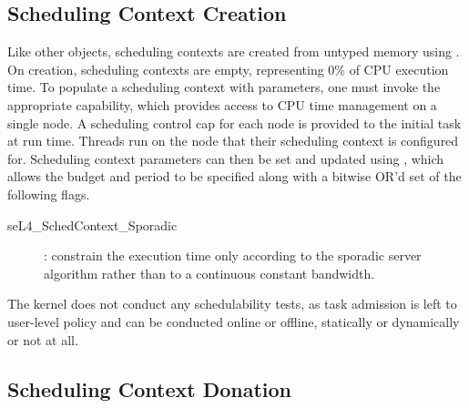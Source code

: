 \subsection{Scheduling Context Creation} \label{sec:sc_creation}

Like other objects, scheduling contexts are created from untyped memory using
.  On creation, scheduling contexts are empty,
representing 0\% of CPU execution time.  To populate a scheduling context with parameters, one must
invoke the appropriate  capability, which provides access to CPU time management
on a single node.  A scheduling control cap for each node is provided to the initial task at run
time.  Threads run on the node that their scheduling context is configured for.  Scheduling context
parameters can then be set and updated using
, which allows the budget and period
to be specified along with a bitwise OR'd set of the following flags.

\begin{description}

\item[seL4\_SchedContext\_Sporadic]: constrain the execution time only according to the
sporadic server algorithm rather than to a continuous constant bandwidth.

\end{description}

The kernel does not conduct any schedulability tests, as task admission is left to user-level policy
and can be conducted online or offline, statically or dynamically or not at all.

\subsection{Scheduling Context Donation} \label{sec:sc_donation}

